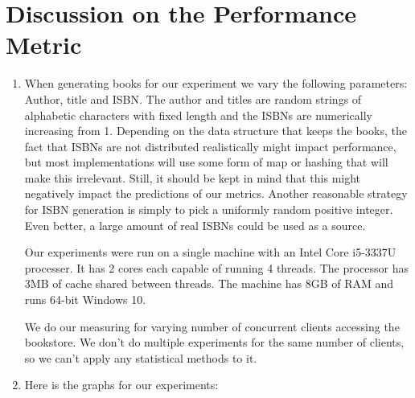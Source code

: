 \documentclass[11pt]{article}
\begin{document}
\section{Discussion on the Performance Metric}
  \begin{enumerate}
    \item
      When generating books for our experiment we vary the following parameters:
      Author, title and ISBN. The author and titles are random strings of alphabetic
      characters with fixed length and the ISBNs are numerically increasing from 1.
      Depending on the data structure that keeps the books, the fact that ISBNs are
      not distributed realistically might impact performance, but most implementations
      will use some form of map or hashing that will make this irrelevant. Still, it
      should be kept in mind that this might negatively impact the predictions of our
      metrics. Another reasonable strategy for ISBN generation is simply to pick a
      uniformly random positive integer. Even better, a large amount of real ISBNs
      could be used as a source.

      Our experiments were run on a single machine with an Intel Core i5-3337U
      processer. It has 2 cores each capable of running 4 threads. The processor has
      3MB of cache shared between threads. The machine has 8GB of RAM and runs 64-bit
      Windows 10.

      We do our measuring for varying number of concurrent clients accessing the
      bookstore. We don't do multiple experiments for the same number of
      clients, so we can't apply any statistical methods to it.

    \item
      Here is the graphs for our experiments:


\end{enumerate}
\end{document}
